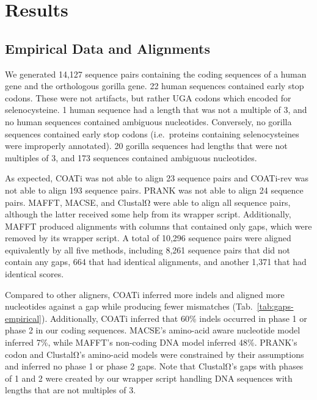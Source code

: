 \documentclass[12pt,letterpaper]{article}
\begin{document}
\section*{Results}

\subsection*{Empirical Data and Alignments}

We generated 14,127 sequence pairs containing the coding sequences of a human gene and the orthologous gorilla gene. 22 human sequences contained early stop codons. These were not artifacts, but rather UGA codons which encoded for selenocysteine. 1 human sequence had a length that was not a multiple of 3, and no human sequences contained ambiguous nucleotides. Conversely, no gorilla sequences contained early stop codons (i.e.\ proteins containing selenocysteines were improperly annotated). 20 gorilla sequences had lengths that were not multiples of 3, and 173 sequences contained ambiguous nucleotides.

As expected, COATi was not able to align 23 sequence pairs and COATi-rev was not able to align 193 sequence pairs. PRANK was not able to align 24 sequence pairs. MAFFT, MACSE, and ClustalΩ were able to align all sequence pairs, although the latter received some help from its wrapper script. Additionally, MAFFT produced alignments with columns that contained only gaps, which were removed by its wrapper script.
A total of 10,296 sequence pairs were aligned equivalently by all five methods, including 8,261 sequence pairs that did not contain any gaps, 664 that had identical alignments, and another 1,371 that had identical scores.

Compared to other aligners, COATi inferred more indels and aligned more nucleotides against a gap while producing fewer mismatches (Tab.~\ref{tab:gaps-empirical}). Additionally, COATi inferred that 60\% indels occurred in phase 1 or phase 2 in our coding sequences. MACSE's amino-acid aware nucleotide model inferred 7\%, while MAFFT's non-coding DNA model inferred 48\%. PRANK's codon and ClustalΩ's amino-acid models were constrained by their assumptions and inferred no phase 1 or phase 2 gaps. Note that ClustalΩ's gaps with phases of 1 and 2 were created by our wrapper script handling DNA sequences with lengths that are not multiples of 3.  
\end{document}
